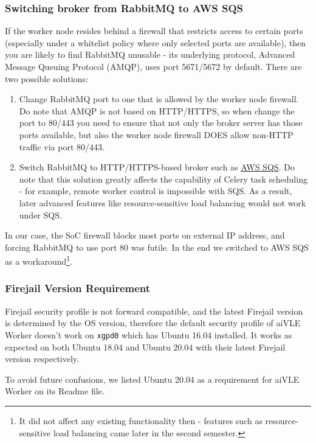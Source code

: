 \subsubsection{Switching broker from RabbitMQ to AWS SQS}
If the worker node resides behind a firewall that restricts access to certain ports (especially under a whitelist policy where only selected ports are available), then you are likely to find RabbitMQ unusable - its underlying protocol, Advanced Message Queuing Protocol (AMQP), uses port 5671/5672 by default. There are two possible solutions:
\begin{enumerate}
    \item Change RabbitMQ port to one that is allowed by the worker node firewall. Do note that AMQP is not based on HTTP/HTTPS, so when change the port to 80/443 you need to ensure that not only the broker server has those ports available, but also the worker node firewall DOES allow non-HTTP traffic via port 80/443.
    \item Switch RabbitMQ to HTTP/HTTPS-based broker such as \href{https://aws.amazon.com/sqs/}{AWS SQS}. Do note that this solution greatly affects the capability of Celery task scheduling - for example, remote worker control is impossible with SQS. As a result, later advanced features like resource-sensitive load balancing would not work under SQS.
\end{enumerate}
In our case, the SoC firewall blocks most ports on external IP address, and forcing RabbitMQ to use port 80 was futile. In the end we switched to AWS SQS as a workaround\footnote{It did not affect any existing functionality then - features such as resource-sensitive load balancing came later in the second semester.}.

\subsubsection{Firejail Version Requirement}
Firejail security profile is not forward compatible, and the latest Firejail version is determined by the OS version, therefore the default security profile of aiVLE Worker doesn't work on  \texttt{xgpd0} which has Ubuntu 16.04 installed. It works as expected on both Ubuntu 18.04 and Ubuntu 20.04 with their latest Firejail version respectively.

To avoid future confusions, we listed Ubuntu 20.04 as a requirement for aiVLE Worker on its Readme file.

